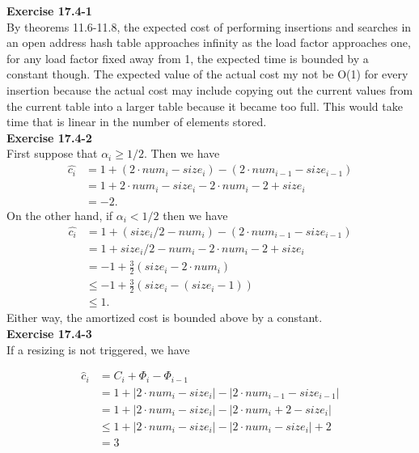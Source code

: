 \documentclass{article}
\begin{document}
\noindent\textbf{Exercise 17.4-1}\\

By theorems 11.6-11.8, the expected cost of performing insertions and searches in an open address hash table approaches infinity as the load factor approaches one, for any load factor fixed away from 1, the expected time is bounded by a constant though. The expected value of the actual cost my not be O(1) for every insertion because the actual cost may include copying out the current values from the current table into a larger table because it became too full. This would take time that is linear in the number of elements stored.\\

\noindent\textbf{Exercise 17.4-2}\\

First suppose that $\alpha_i \geq 1/2$.  Then we have
\begin{align*}
\hat{c_i} &= 1 + (2\cdot num_i - size_i) - (2\cdot num_{i-1} - size_{i-1}) \\
&=  1 + 2\cdot num_i - size_i - 2 \cdot num_i - 2 + size_i \\
&= -2.
\end{align*}
On the other hand, if $\alpha_i < 1/2$ then we have
\begin{align*}
\hat{c_i} &= 1 + (size_i/2 - num_i) - (2\cdot num_{i-1} - size_{i-1}) \\
&= 1 + size_i/2 - num_i - 2\cdot num_i - 2 + size_i \\
&= -1 + \frac{3}{2}(size_i - 2\cdot num_i)\\
&\leq -1 + \frac{3}{2}(size_i - (size_i - 1)) \\
&\leq 1.
\end{align*}
Either way, the amortized cost is bounded above by a constant. \\

\noindent\textbf{Exercise 17.4-3}\\

If a resizing is not triggered, we have

\begin{align*}
\hat{c}_i & = C_i + \Phi_i-\Phi_{i-1}\\
&= 1 + |2\cdot num_i - size_i| - |2\cdot num_{i-1} - size_{i-1}|\\
&= 1 + |2\cdot num_i - size_i| - |2\cdot num_i + 2  - size_{i}|\\
&\le 1 + |2\cdot num_i - size_i| - |2\cdot num_i  - size_{i}| + 2\\
&= 3
\end{align*}
\end{document}
